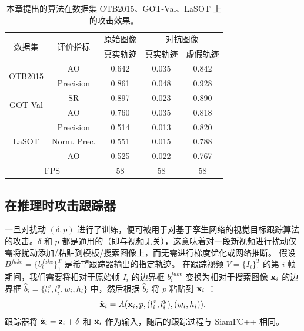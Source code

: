 \begin{table}[t]
\centering
\caption{本章提出的算法在数据集 OTB2015、GOT-Val、LaSOT 上的攻击效果。}
\begin{tabular}{c c c c c}
\toprule
\multirow{2}{*}[-2pt]{数据集} & \multirow{2}{*}[-2pt]{评价指标} & 原始图像 & \multicolumn{2}{c}{对抗图像}  \\
\cmidrule(lr){3-3} \cmidrule(lr){4-5}
                          &                         & 真实轨迹 & 真实轨迹 & 虚假轨迹     \\ 
\midrule
\multirow{2}{*}{OTB2015} 
& AO   & 0.642 & 0.035 & 0.842\\
& Precision & 0.861 & 0.048 & 0.928\\
\midrule
\multirow{2}{*}{GOT-Val} 
& SR & 0.897 & 0.023 & 0.890\\
& AO 				   & 0.760 & 0.035 & 0.818 \\
\midrule
\multirow{3}{*}{LaSOT} 
& Precision       & 0.514 & 0.013 & 0.820\\
& Norm. Prec. & 0.551 & 0.015 & 0.788\\
& AO & 0.525 & 0.022 & 0.767\\
\midrule
\multicolumn{2}{c}{FPS} & 58 & 58 & 58\\
\bottomrule
\end{tabular}
\label{tab:attack_benchmark results}
\end{table}

\subsection{在推理时攻击跟踪器}

一旦对扰动 $(\delta, p)$ 进行了训练，便可被用于对基于孪生网络的视觉目标跟踪算法的攻击。$\delta$ 和 $p$ 都是通用的（即与视频无关），这意味着对一段新视频进行扰动仅需将扰动添加/粘贴到模板/搜索图像上，而无需进行梯度优化或网络推断。
假设 $B^{fake}=\{b^{fake}_i\}_1^{T}$ 是希望跟踪器输出的指定轨迹。
在跟踪视频 $V=\{I_i\}_1^T$ 的第 $i$ 帧期间，我们需要将相对于原始帧 $I_i$ 的边界框 $b^{fake}_i$ 变换为相对于搜索图像 $\textbf x_i$ 的边界框 $\hat b_i=\{l^x_i, l^y_i, w_i, h_i\}$ 中，然后根据 $\hat b_i$ 将 $p$ 粘贴到 $\textbf x_i$ ：
\begin{equation}
\tilde{\textbf x}_i = A(\textbf x_i, p, (l^x_i, l^y_i), (w_i, h_i)).
\end{equation}
跟踪器将 $\tilde{\textbf z}_i=\textbf z_i+\delta$ 和 $\tilde{\textbf x}_i$ 作为输入，随后的跟踪过程与 SiamFC++ 相同。

